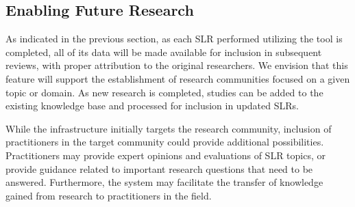 \subsection{Enabling Future Research}
As indicated in the previous section, as each SLR performed utilizing the tool is completed, all of its data will be made available for inclusion in subsequent reviews, with proper attribution to the original researchers. We envision that this feature will support the establishment of research communities focused on a given topic or domain. As new research is completed, studies can be added to the existing knowledge base and processed for inclusion in updated SLRs.

While the infrastructure initially targets the research community, inclusion of practitioners in the target community could provide additional possibilities. Practitioners may provide expert opinions and evaluations of SLR topics, or provide guidance related to important research questions that need to be answered. Furthermore, the system may facilitate the transfer of knowledge gained from research to practitioners in the field.

